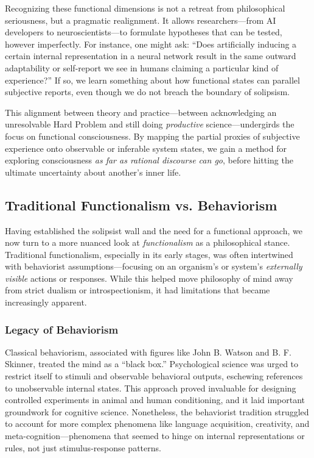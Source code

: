 \documentclass[12pt]{article}
\begin{document}
Recognizing these functional dimensions is not a retreat from philosophical seriousness, but a pragmatic realignment. It allows researchers---from AI developers to neuroscientists---to formulate hypotheses that can be tested, however imperfectly. For instance, one might ask: ``Does artificially inducing a certain internal representation in a neural network result in the same outward adaptability or self-report we see in humans claiming a particular kind of experience?'' If so, we learn something about how functional states can parallel subjective reports, even though we do not breach the boundary of solipsism.

This alignment between theory and practice---between acknowledging an unresolvable Hard Problem and still doing \textit{productive} science---undergirds the focus on functional consciousness. By mapping the partial proxies of subjective experience onto observable or inferable system states, we gain a method for exploring consciousness \textit{as far as rational discourse can go}, before hitting the ultimate uncertainty about another's inner life.

\subsection{Traditional Functionalism vs. Behaviorism}

Having established the solipsist wall and the need for a functional approach, we now turn to a more nuanced look at \textit{functionalism} as a philosophical stance. Traditional functionalism, especially in its early stages, was often intertwined with behaviorist assumptions---focusing on an organism's or system's \textit{externally visible} actions or responses. While this helped move philosophy of mind away from strict dualism or introspectionism, it had limitations that became increasingly apparent.

\subsubsection{Legacy of Behaviorism}

Classical behaviorism, associated with figures like John B. Watson and B. F. Skinner, treated the mind as a ``black box.'' Psychological science was urged to restrict itself to stimuli and observable behavioral outputs, eschewing references to unobservable internal states. This approach proved invaluable for designing controlled experiments in animal and human conditioning, and it laid important groundwork for cognitive science. Nonetheless, the behaviorist tradition struggled to account for more complex phenomena like language acquisition, creativity, and meta-cognition---phenomena that seemed to hinge on internal representations or rules, not just stimulus-response patterns.
\end{document}
